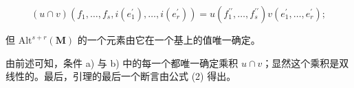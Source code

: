 \[
(u \cap v) (f _ {1}, \dots , f _ {s}, i (e _ {1} ^ {\prime}), \dots , i (e _ {r} ^ {\prime})) = u (f _ {1} ^ {\prime \prime}, \dots , f _ {s} ^ {\prime \prime}) v (e _ {1} ^ {\prime}, \dots , e _ {r} ^ {\prime});\tag{2}
\]

但 \(\mathrm{Alt}^{s + r}(\mathbf{M})\) 的一个元素由它在一个基上的值唯一确定。

由前述可知，条件 a) 与 b) 中的每一个都唯一确定乘积 \(u \cap v\)；显然这个乘积是双线性的。最后，引理的最后一个断言由公式 (2) 得出。